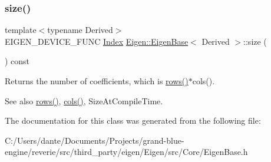 \subsubsection{\texorpdfstring{size()}{size()}}
{\footnotesize\ttfamily template$<$typename Derived$>$ \\
E\+I\+G\+E\+N\+\_\+\+D\+E\+V\+I\+C\+E\+\_\+\+F\+U\+NC \mbox{\hyperlink{struct_eigen_1_1_eigen_base_a554f30542cc2316add4b1ea0a492ff02}{Index}} \mbox{\hyperlink{struct_eigen_1_1_eigen_base}{Eigen\+::\+Eigen\+Base}}$<$ Derived $>$\+::size (\begin{DoxyParamCaption}{ }\end{DoxyParamCaption}) const\hspace{0.3cm}{\ttfamily [inline]}}

\begin{DoxyReturn}{Returns}
the number of coefficients, which is \mbox{\hyperlink{struct_eigen_1_1_eigen_base_a8141320ba8df384426c298b32b000d8e}{rows()}}$\ast$cols(). 
\end{DoxyReturn}
\begin{DoxySeeAlso}{See also}
\mbox{\hyperlink{struct_eigen_1_1_eigen_base_a8141320ba8df384426c298b32b000d8e}{rows()}}, \mbox{\hyperlink{struct_eigen_1_1_eigen_base_a7b0b45c7351847696c911ce8aa2abbdb}{cols()}}, Size\+At\+Compile\+Time. 
\end{DoxySeeAlso}


The documentation for this class was generated from the following file\+:\begin{DoxyCompactItemize}
\item 
C\+:/\+Users/dante/\+Documents/\+Projects/grand-\/blue-\/engine/reverie/src/third\+\_\+party/eigen/\+Eigen/src/\+Core/Eigen\+Base.\+h\end{DoxyCompactItemize}
